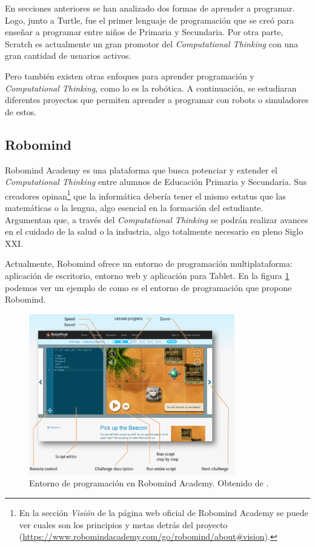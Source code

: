 {\color{blue}
En secciones anteriores se han analizado dos formas de aprender a programar. Logo, junto a Turtle, fue el primer lenguaje de programación que se creó para enseñar a programar entre niños de Primaria y Secundaria. Por otra parte, Scratch es actualmente un gran promotor del \emph{Computational Thinking} con una gran cantidad de usuarios activos.
}

Pero también existen otras enfoques para aprender programación y \emph{Computational Thinking}, como lo es la robótica. A continuación, se estudiaran diferentes proyectos que permiten aprender a programar con robots o simuladores de estos.

\subsection{Robomind}
\label{sec:robomind}


Robomind Academy\cite{robomind-web} es una plataforma que busca potenciar y extender el \emph{Computational Thinking} entre alumnos de Educación Primaria y Secundaria. Sus creadores opinan\footnote{En la sección \emph{Visión} de la página web oficial de Robomind Academy se puede ver cuales son los principios y metas detrás del proyecto (\url{https://www.robomindacademy.com/go/robomind/about#vision}).} que la informática debería tener el mismo estatus que las matemáticas o la lengua, algo esencial en la formación del estudiante. Argumentan que, a través del \emph{Computational Thinking} se podrán realizar avances en el cuidado de la salud o la industria, algo totalmente necesario en pleno Siglo XXI. 


Actualmente, Robomind ofrece un entorno de programación multiplataforma: aplicación de escritorio, entorno web y aplicación para Tablet. En la figura \ref{fig:robomind-entorno} podemos ver un ejemplo de como es el entorno de programación que propone Robomind.


\begin{figure}[!ht]
	\begin{centering}
		\includegraphics[width=0.8\textwidth]{images/robomind-entorno.png}
			\caption{Entorno de programación en Robomind Academy. Obtenido de \cite{robomind-web}.}
				\label{fig:robomind-entorno}
	\end{centering}
\end{figure}


